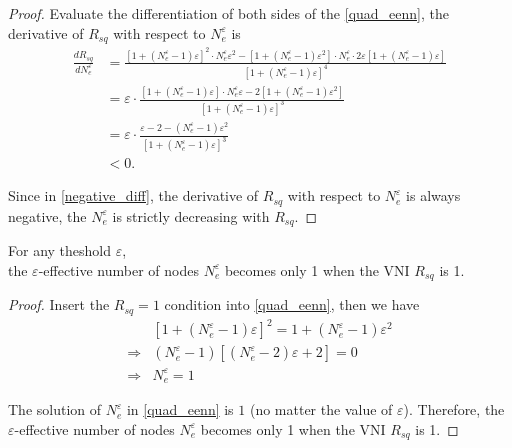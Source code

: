 \begin{proof}
        
    Evaluate the differentiation of both sides of the \eqref{quad_eenn},
    the derivative of $R_{sq}$ with respect to $N_e^\varepsilon$ is
    \begin{equation}
        \begin{aligned}
        \frac{dR_{sq}}{dN_e^\varepsilon}&=
        \frac{[1+(N_e^\varepsilon-1)\varepsilon]^2\cdot N_e^\varepsilon\varepsilon^2
        -[1+(N_e^\varepsilon-1)\varepsilon^2]\cdot N_e^\varepsilon \cdot 2\varepsilon[1+(N_e^\varepsilon-1)\varepsilon]}
        {[1+(N_e^\varepsilon-1)\varepsilon]^4}\\
        &=\varepsilon\cdot
        \frac{[1+(N_e^\varepsilon-1)\varepsilon]\cdot N_e^\varepsilon\varepsilon
        -2[1+(N_e^\varepsilon-1)\varepsilon^2]}
        {[1+(N_e^\varepsilon-1)\varepsilon]^3}\\
        &=\varepsilon\cdot
        \frac{\varepsilon-2-(N_e^\varepsilon-1)\varepsilon^2}
        {[1+(N_e^\varepsilon-1)\varepsilon]^3}\\
        &<0.
        \end{aligned}
        \label{negative_diff}
    \end{equation}

    Since in \eqref{negative_diff}, the derivative of $R_{sq}$ with respect to $N_e^\varepsilon$
    is always negative,
    the $N_e^\varepsilon$ is strictly decreasing with $R_{sq}$.

\end{proof}


\begin{theorem}
    \label{collapse}
    For any theshold $\varepsilon$,
    \\the $\varepsilon$-effective number of nodes $N_e^\varepsilon$ becomes only 1
    when the VNI $R_{sq}$ is 1.
\end{theorem}

\begin{proof}
    Insert the $R_{sq}=1$ condition into \eqref{quad_eenn}, then we have
    \begin{equation}
        \begin{aligned}
            &[1+(N_e^\varepsilon-1)\varepsilon]^2=1+(N_e^\varepsilon-1)\varepsilon^2\\
            \Rightarrow&(N_e^\varepsilon-1)[(N_e^\varepsilon-2)\varepsilon+2]=0\\
            \Rightarrow& N_e^\varepsilon=1
        \end{aligned}
        \label{collapse_eqn}
    \end{equation}

    The solution of $N_e^\varepsilon$ in \eqref{quad_eenn} is $1$ 
    (no matter the value of $\varepsilon$).
    Therefore, the $\varepsilon$-effective number of nodes $N_e^\varepsilon$ becomes only 1
    when the VNI $R_{sq}$ is 1.
\end{proof}

